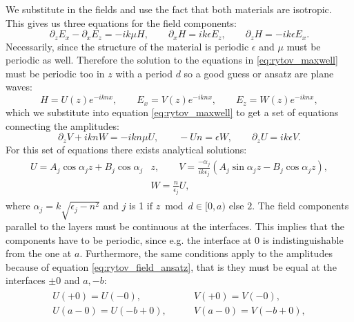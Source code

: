 We substitute in the fields and use the fact that both materials are isotropic. This gives us three equations for the field components:
\begin{equation}
    \label{eq:rytov_maxwell}
    \partial_z E_x - \partial_x E_z = - ik \mu H,
    \qquad
    \partial_x H = ik \epsilon E_z,
    \qquad
    \partial_z H = -ik \epsilon E_x.
\end{equation}
Necessarily, since the structure of the material is periodic $\epsilon$ and $\mu$ must be periodic as well. Therefore the solution to the equations in \ref{eq:rytov_maxwell} must be periodic too in $z$ with a period $d$ so a good guess or ansatz are plane waves:
\begin{equation}
    \label{eq:rytov_field_ansatz}
    H = U(z)e^{-iknx},
    \qquad
    E_x = V(z)e^{-iknx},
    \qquad
    E_z = W(z)e^{-iknx},
\end{equation}
which we substitute into equation \ref{eq:rytov_maxwell} to get a set of equations connecting the amplitudes:
\begin{equation}
    \partial_z V + iknW = -ikn \mu U,
    \qquad
    -Un = \epsilon W,
    \qquad
    \partial_z U = ik \epsilon V.
\end{equation}
For this set of equations there exists analytical solutions:
\begin{align}
\begin{split}
    \label{eq:rytov_amplitudes}
    U=A_j\cos \alpha_jz + B_j\cos \alpha_j & z, 
    \qquad
    V=\frac{-\alpha_j}{ik\epsilon_j}(A_j\sin \alpha_j z -B_j\cos \alpha_j z ),
    \\
    &W=\frac{n}{\epsilon_j}U,
\end{split}
\end{align}
where $\alpha_j = k \sqrt{\epsilon_j-n^2}$ and $j$ is 1 $\text{if $z \bmod d \in [0, a)$}$ else $2$. The field components parallel to the layers must be continuous at the interfaces. This implies that the components have to be periodic, since e.g. the interface at $0$ is indistinguishable from the one at $a$. Furthermore, the same conditions apply to the amplitudes because of equation \ref{eq:rytov_field_ansatz}, that is they must be equal at the interfaces $\pm 0$ and $a, -b$:
\begin{align}
\begin{split}
    U(+0) = U(-0), 
    \qquad
    &V(+0) = V(-0),
    \\
    U(a-0) = U(-b+0),
    \qquad
    &V(a-0) = V(-b+0),
\end{split}
\end{align}
